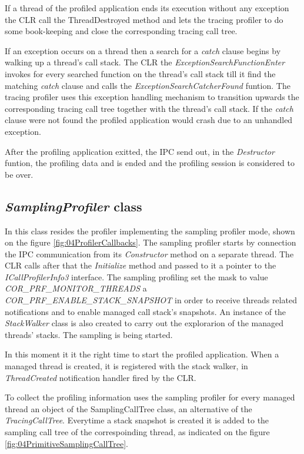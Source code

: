 If a thread of the profiled application ends its execution without any exception the CLR call the ThreadDestroyed method and lets the tracing profiler to do some book-keeping and close the corresponding tracing call tree.

If an exception occurs on a thread then a search for a \textit{catch} clause begins by walking up a thread's call stack. The CLR the \textit{ExceptionSearchFunctionEnter} invokes for every searched function on the thread's call stack till it find the matching \textit{catch} clause and calls the \textit{ExceptionSearchCatcherFound} funtion. The tracing profiler uses this exception handling mechanism to transition upwards the corresponding tracing call tree together with the thread's call stack. If the \textit{catch} clause were not found the profiled application would crash due to an unhandled exception.
 
After the profiling application exitted, the IPC send out, in the \textit{Destructor} funtion, the profiling data and is ended and the profiling session is considered to be over.


\subsection{\textit{SamplingProfiler} class}
In this class resides the profiler implementing the sampling profiler mode, shown on the figure \ref{fig:04ProfilerCallbacks}. The sampling profiler starts by connection the IPC communication from its \textit{Constructor} method on a separate thread. The CLR calls after that the \textit{Initialize} method and passed to it a pointer to the \textit{ICallProfilerInfo3} interface. The sampling profiling set the mask to value \textit{COR\_PRF\_MONITOR\_THREADS} a \textit{COR\_PRF\_ENABLE\_STACK\_SNAPSHOT} in order to receive threads related notifications and to enable managed call stack's snapshots. An instance of the \textit{StackWalker} class is also created to carry out the explorarion of the managed threads' stacks. The sampling is being started.

In this moment it it the right time to start the profiled application. When a managed thread is created, it is registered with the stack walker, in \textit{ThreadCreated} notification handler fired by the CLR.

To collect the profiling information uses the sampling profiler for every managed thread an object of the SamplingCallTree class, an alternative of the \textit{TracingCallTree}. Everytime a stack snapshot is created it is added to the sampling call tree of the correspoinding thread, as indicated on the figure \ref{fig:04PrimitiveSamplingCallTree}. 

